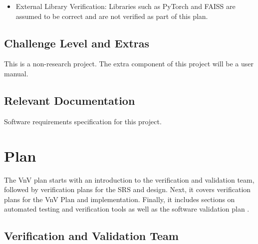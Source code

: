 \documentclass[12pt, titlepage]{article}
\begin{document}
\begin{itemize}
  \item External Library Verification: Libraries such as PyTorch and FAISS are assumed to be correct and are not verified as part of this plan.
\end{itemize}

\subsection{Challenge Level and Extras}
This is a non-research project. The extra component of this project will be a user manual.

\subsection{Relevant Documentation}

\citet{Yinying2025RecSys} Software requirements specification for this project.

\section{Plan}

The VnV plan starts with an introduction to the verification and validation team, followed by verification plans for the SRS and design. Next, it covers verification plans for the VnV Plan and implementation. Finally, it includes sections on automated testing and verification tools as well as the software validation plan .

\subsection{Verification and Validation Team}\label{VnVT}

\begin{table}[h]
  \centering
  \caption{Verification and Validation Team}
  \label{Table:VnVT}
  \end{table}
  
\end{document}
